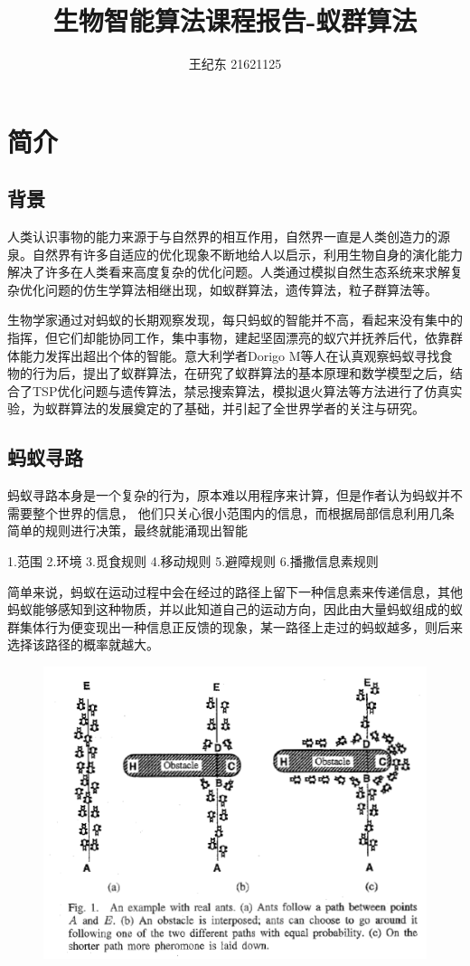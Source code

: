 \documentclass[12pt,nofonts]{ctexart}
\begin{document}
\title{生物智能算法课程报告-蚁群算法}
\author{王纪东 21621125}
\maketitle
\section{简介}
\subsection{背景}
人类认识事物的能力来源于与自然界的相互作用，自然界一直是人类创造力的源泉。自然界有许多自适应的优化现象不断地给人以启示，利用生物自身的演化能力解决了许多在人类看来高度复杂的优化问题。人类通过模拟自然生态系统来求解复杂优化问题的仿生学算法相继出现，如蚁群算法，遗传算法，粒子群算法等。

生物学家通过对蚂蚁的长期观察发现，每只蚂蚁的智能并不高，看起来没有集中的指挥，但它们却能协同工作，集中事物，建起坚固漂亮的蚁穴并抚养后代，依靠群体能力发挥出超出个体的智能。意大利学者Dorigo M\cite{ref0,ref4}等人在认真观察蚂蚁寻找食物的行为后，提出了蚁群算法，在研究了蚁群算法的基本原理和数学模型之后，结合了TSP优化问题与遗传算法，禁忌搜索算法，模拟退火算法等方法进行了仿真实验，为蚁群算法的发展奠定的了基础，并引起了全世界学者的关注与研究。
\subsection{蚂蚁寻路}
蚂蚁寻路本身是一个复杂的行为，原本难以用程序来计算，但是作者认为蚂蚁并不需要整个世界的信息，
他们只关心很小范围内的信息，而根据局部信息利用几条简单的规则进行决策，最终就能涌现出智能

1.范围
2.环境
3.觅食规则
4.移动规则
5.避障规则
6.播撒信息素规则

简单来说，蚂蚁在运动过程中会在经过的路径上留下一种信息素来传递信息，其他蚂蚁能够感知到这种物质，并以此知道自己的运动方向，因此由大量蚂蚁组成的蚁群集体行为便变现出一种信息正反馈的现象，某一路径上走过的蚂蚁越多，则后来选择该路径的概率就越大。
\begin{figure}
\includegraphics[width=\textwidth,height=0.4\textheight]{ants.png}
\end{figure}
\end{document}
